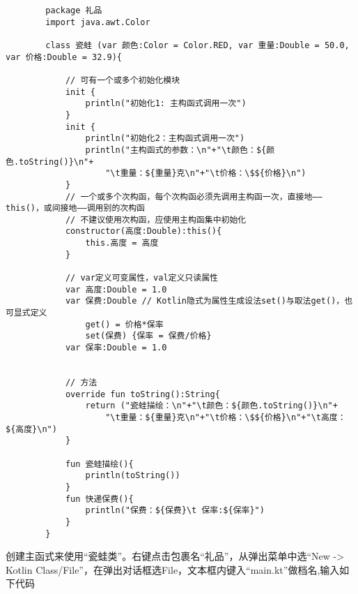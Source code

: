     \begin{verbatim}
        package 礼品
        import java.awt.Color

        class 瓷蛙 (var 颜色:Color = Color.RED, var 重量:Double = 50.0, var 价格:Double = 32.9){

            // 可有一个或多个初始化模块
            init {
                println("初始化1: 主构函式调用一次")
            }
            init {
                println("初始化2：主构函式调用一次")
                println("主构函式的参数：\n"+"\t颜色：${颜色.toString()}\n"+
                    "\t重量：${重量}克\n"+"\t价格：\$${价格}\n")
            }
            // 一个或多个次构函，每个次构函必须先调用主构函一次，直接地——this()，或间接地——调用别的次构函
            // 不建议使用次构函，应使用主构函集中初始化
            constructor(高度:Double):this(){
                this.高度 = 高度
            }

            // var定义可变属性，val定义只读属性
            var 高度:Double = 1.0
            var 保费:Double // Kotlin隐式为属性生成设法set()与取法get()，也可显式定义
                get() = 价格*保率
                set(保费) {保率 = 保费/价格}
            var 保率:Double = 1.0


            // 方法
            override fun toString():String{
                return ("瓷蛙描绘：\n"+"\t颜色：${颜色.toString()}\n"+
                    "\t重量：${重量}克\n"+"\t价格：\$${价格}\n"+"\t高度：${高度}\n")
            }

            fun 瓷蛙描绘(){
                println(toString())
            }
            fun 快递保费(){
                println("保费：${保费}\t 保率:${保率}")
            }
        }

    \end{verbatim}

创建主函式来使用“瓷蛙类”。右键点击包裹名“礼品”，从弹出菜单中选“New -> Kotlin Class/File”，在弹出对话框选File，文本框内键入“main.kt”做档名,输入如下代码

